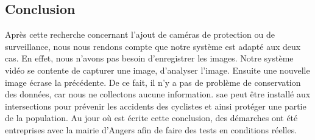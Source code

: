 \subsection{Conclusion}
\label{reglementation_Conclusion}
Après cette recherche concernant l'ajout de caméras de protection ou de surveillance, nous nous rendons compte que notre système est adapté aux deux cas.
En effet, nous n'avons pas besoin d'enregistrer les images. Notre système vidéo se contente de capturer une image, d'analyser l'image. Ensuite une nouvelle image écrase la précédente.
De ce fait, il n'y a pas de problème de conservation des données, car nous ne collectons aucune information. 
\gls{sae} peut être installé aux intersections pour prévenir les accidents des cyclistes et ainsi protéger une partie de la population. 
Au jour où est écrite cette conclusion, des démarches ont été entreprises avec la mairie d'Angers afin de faire des tests en conditions réelles.